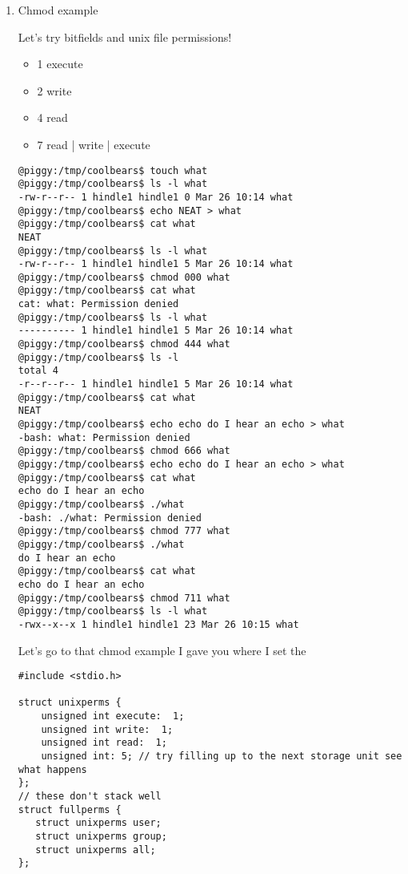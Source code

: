 \documentclass[11pt]{article}
\begin{document}
\begin{enumerate}
\item Chmod example
\label{sec:org3ff07dd}

Let's try bitfields and unix file permissions!

\begin{itemize}
\item 1 execute
\item 2 write
\item 4 read

\item 7 read | write | execute
\end{itemize}

\begin{verbatim}
@piggy:/tmp/coolbears$ touch what
@piggy:/tmp/coolbears$ ls -l what
-rw-r--r-- 1 hindle1 hindle1 0 Mar 26 10:14 what
@piggy:/tmp/coolbears$ echo NEAT > what
@piggy:/tmp/coolbears$ cat what
NEAT
@piggy:/tmp/coolbears$ ls -l what
-rw-r--r-- 1 hindle1 hindle1 5 Mar 26 10:14 what
@piggy:/tmp/coolbears$ chmod 000 what
@piggy:/tmp/coolbears$ cat what
cat: what: Permission denied
@piggy:/tmp/coolbears$ ls -l what
---------- 1 hindle1 hindle1 5 Mar 26 10:14 what
@piggy:/tmp/coolbears$ chmod 444 what
@piggy:/tmp/coolbears$ ls -l
total 4
-r--r--r-- 1 hindle1 hindle1 5 Mar 26 10:14 what
@piggy:/tmp/coolbears$ cat what
NEAT
@piggy:/tmp/coolbears$ echo echo do I hear an echo > what
-bash: what: Permission denied
@piggy:/tmp/coolbears$ chmod 666 what
@piggy:/tmp/coolbears$ echo echo do I hear an echo > what
@piggy:/tmp/coolbears$ cat what
echo do I hear an echo
@piggy:/tmp/coolbears$ ./what
-bash: ./what: Permission denied
@piggy:/tmp/coolbears$ chmod 777 what
@piggy:/tmp/coolbears$ ./what
do I hear an echo
@piggy:/tmp/coolbears$ cat what
echo do I hear an echo
@piggy:/tmp/coolbears$ chmod 711 what
@piggy:/tmp/coolbears$ ls -l what
-rwx--x--x 1 hindle1 hindle1 23 Mar 26 10:15 what
\end{verbatim}

Let's go to that chmod example I gave you where I set the 

\begin{verbatim}
#include <stdio.h>

struct unixperms {
    unsigned int execute:  1;
    unsigned int write:  1;
    unsigned int read:  1;
    unsigned int: 5; // try filling up to the next storage unit see what happens
};
// these don't stack well
struct fullperms {
   struct unixperms user;
   struct unixperms group;
   struct unixperms all;
};


\end{verbatim}
\end{enumerate}
\end{document}
